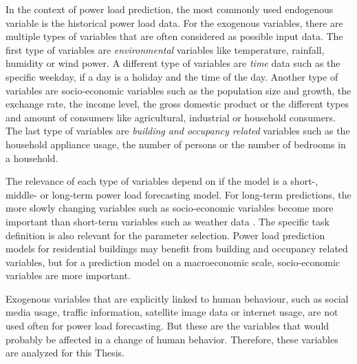 In the context of power load prediction, the most commonly 
used endogenous variable is the historical power load data.
For the exogenous variables, there are multiple types of 
variables that are often considered as possible input data.
The first type of variables are \textit{environmental} variables like temperature, 
rainfall, humidity or wind power. A different type of variables are \textit{time} data
such as the specific weekday, if a day is a holiday and the time of the day.
Another type of variables are socio-economic variables such as the
population size and growth, the exchange rate, the income level,
the gross domestic product or the different types and amount 
of consumers like agricultural, industrial or household consumers.
The last type of variables are \textit{building and occupancy related} variables such
as the household appliance usage,
the number of persons or the number of bedrooms in a household.

The relevance of each type of variables depend on if the model is
a short-, middle- or long-term power load forecasting model. For 
long-term predictions, the more slowly changing variables such as socio-economic
variables become more important than short-term variables such as weather data 
\cite{loadforecastingtimedependency2}\cite{loadforecastingtimedependency}.
The specific task definition is also relevant for the parameter selection.
Power load prediction models for residential buildings may benefit from 
building and occupancy related variables, but for a prediction model on a 
macroeconomic scale, socio-economic variables are more important.

Exogenous variables that are explicitly linked to human behaviour, 
such as social media usage, traffic information, satellite image data or 
internet usage, are not used often for power load forecasting. 
But these are the variables that would probably be affected in a change of 
human behavior. Therefore, these variables are analyzed for this Thesis.

